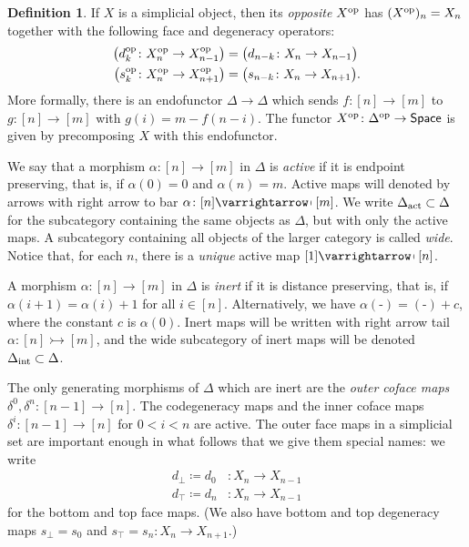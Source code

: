 \documentclass{conm-p-l}
\theoremstyle{definition}
\newtheorem{definition}[theorem]{Definition}
\theoremstyle{remark}
\newcommand{\spaces}{\mathsf{Space}}
\newcommand{\op}{\textup{op}}
\newcommand{\actrm}{\textup{act}}
\newcommand{\intrm}{\textup{int}}
\newcommand{\delact}{\Delta_\actrm}
\newcommand{\delint}{\Delta_\intrm}
\newcommand{\ract}{\varrightarrow\mapsfromchar}
\newcommand{\rint}{\rightarrowtail}
\begin{document}
\begin{definition}
If $X$ is a simplicial object, then its \emph{opposite} $X^\op$ has $(X^\op)_n = X_n$ together with the following face and degeneracy operators: \begin{align*} \big( d_k^{\op} \colon X^\op_n \to X^\op_{n-1} \big) &= \big( d_{n-k} \colon X_n \to X_{n-1} \big)
\\
\big( s_k^{\op} \colon X^\op_n \to X^\op_{n+1} \big) &= \big( s_{n-k} \colon X_n \to X_{n+1} \big).
\end{align*}
More formally, there is an endofunctor $\Delta \to \Delta$ which sends $f \colon [n] \to [m]$ to $g \colon [n] \to [m]$ with $g(i) = m-f(n-i)$.
The functor $X^\op \colon \Delta^\op \to \spaces$ is given by precomposing $X$ with this endofunctor.
\end{definition}

We say that a morphism $\alpha \colon [n] \to [m]$ in $\Delta$ is \emph{active} if it is endpoint preserving, that is, if $\alpha(0) = 0$ and $\alpha(n) = m$.
Active maps will denoted by arrows with right arrow to bar %
$\alpha \colon [n] \ract [m]$.
We write $\delact \subset \Delta$ for the subcategory containing the same objects as $\Delta$, but with only the active maps.
A subcategory containing all objects of the larger category is called \emph{wide}.
Notice that, for each $n$, there is a \emph{unique} active map $[1] \ract [n]$.

A morphism $\alpha \colon [n] \to [m]$ in $\Delta$ is \emph{inert} if it is distance preserving, that is, if $\alpha(i+1) = \alpha(i) + 1$ for all $i\in [n]$.
Alternatively, we have $\alpha(\text{-}) = (\text{-}) + c$, where the constant $c$ is $\alpha(0)$.
Inert maps will be written with right arrow tail $\alpha \colon [n] \rint [m]$, and the wide subcategory of inert maps will be denoted $\delint \subset \Delta$.

The only generating morphisms of $\Delta$ which are inert are the \emph{outer coface maps} $\delta^0, \delta^{n} \colon [n-1] \to [n]$.
The codegeneracy maps and the inner coface maps $\delta^i \colon [n-1] \to [n]$ for $0 < i < n$ are active.
The outer face maps in a simplicial set are important enough in what follows that we give them special names: we write
\begin{align*}
  d_\bot \coloneqq d_0 &\colon X_n \to X_{n-1} \\
  d_\top \coloneqq d_n &\colon X_n \to X_{n-1}
\end{align*}
for the bottom and top face maps.
(We also have bottom and top degeneracy maps $s_\bot = s_0$ and $s_\top = s_n \colon X_n \to X_{n+1}$.)
\end{document}
